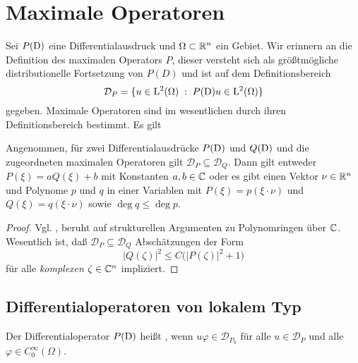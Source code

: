 \chapter{Maximale Operatoren}


Sei $P(\mathrm D)$ eine Differentialausdruck und $\Omega\subset\mathbb R^n$ ein Gebiet. Wir erinnern an die Definition des maximalen Operators $P$, dieser versteht sich als größtmögliche distributionelle Fortsetzung von $P(D)$ und ist auf dem Definitionsbereich
\begin{equation}
   \mathcal D_P = \{ u\in\mathrm L^2(\Omega)\;:\; P(\mathrm D)u\in\mathrm L^2(\Omega) \}
\end{equation}
gegeben. Maximale Operatoren sind im wesentlichen durch ihren Definitionsbereich bestimmt. Es gilt
\begin{thm}
Angenommen, für zwei Differentialausdrücke $P(\mathrm D)$ und $Q(\mathrm D)$ und die zugeordneten maximalen Operatoren gilt $\mathcal D_P\subseteq\mathcal D_Q$. Dann gilt
entweder $P(\xi)=a Q(\xi) + b$ mit Konstanten $a,b\in\mathbb C$ oder es gibt einen Vektor $\nu\in\mathbb R^n$ und Polynome $p$ und $q$ in einer Variablen mit
$P(\xi)=p(\xi\cdot\nu)$ und $Q(\xi)=q(\xi\cdot\nu)$ sowie $\deg q\le\deg p$.
\end{thm}
\begin{proof} Vgl. \cite{Hormander:1955}, beruht auf strukturellen Argumenten zu Polynomringen über $\mathbb C$. Wesentlich ist, daß $\mathcal D_P\subseteq \mathcal D_Q$ Abschätzungen der Form
\begin{equation}
   |Q(\zeta)|^2 \le C \big( |P(\zeta)|^2 + 1\big)%
\end{equation}
für alle {\em komplexen} $\zeta\in\mathbb C^n$ impliziert.
\end{proof}




\section{Differentialoperatoren von lokalem Typ} %
\begin{df}
Der Differentialoperator $P(\mathrm D)$ heißt , wenn $u\varphi\in\mathcal D_{P_0}$ für alle $u\in\mathcal D_{P}$ und alle $\varphi\in C_0^\infty(\Omega)$.
\end{df}

